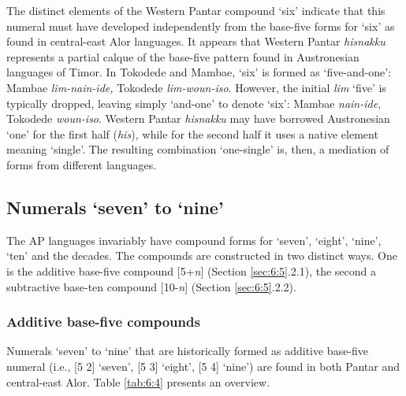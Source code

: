 \documentclass[output=paper]{LSP/langsci}
\begin{document}
The distinct elements of the Western Pantar compound `six' indicate that this numeral must have developed independently from the base-five forms for `six' as found in central-east Alor languages. It appears that Western Pantar \textit{hisnakku}\textit{{\ng}} represents a partial calque of the base-five pattern found in Austronesian languages of Timor. In Tokodede and Mambae, `six' is formed as `five-and-one': Mambae \textit{lim-nain-ide,} Tokodede \textit{lim-woun-iso}. However, the initial \textit{lim} `five' is typically dropped, leaving simply `and-one' to denote `six': Mambae \textit{nain-ide,} Tokodede \textit{woun-iso}. Western Pantar \textit{hisnakku}\textit{{\ng}} may have borrowed Austronesian `one' for the first half (\textit{his})\textit{,} while for the second half it uses a native element meaning `single'. The resulting combination `one-single' is, then, a mediation of forms from different languages.

\subsection{Numerals `seven' to `nine'}
The AP languages invariably have compound forms for `seven', `eight', `nine', `ten' and the decades. The compounds are constructed in two distinct ways. One is the additive base-five compound [5+\textit{n}] (Section \ref{sec:6:5}.2.1), the second a subtractive base-ten compound [10-\textit{n}] (Section \ref{sec:6:5}.2.2). 

\subsubsection{Additive base-five compounds} 
Numerals `seven' to `nine' that are historically formed as additive base-five numeral (i.e., [5 2] `seven', [5 3] `eight', [5 4] `nine') are found in both Pantar and central-east Alor. Table \ref{tab:6:4} presents an overview.

 
\end{document}

